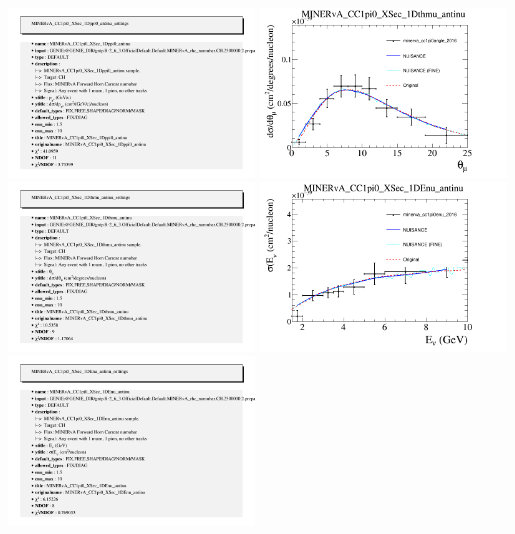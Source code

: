 \documentclass{article}
\begin{document}
\includegraphics[width=0.49\textwidth]{figures/minerva_numub_ccpi0ppi_2015_info.png}
\centering
\includegraphics[width=0.49\textwidth]{figures/minerva_cc1pi0angle_2016_comp.png}
\includegraphics[width=0.49\textwidth]{figures/minerva_cc1pi0angle_2016_info.png}
\centering
\includegraphics[width=0.49\textwidth]{figures/minerva_cc1pi0enu_2016_comp.png}
\includegraphics[width=0.49\textwidth]{figures/minerva_cc1pi0enu_2016_info.png}
\end{document}
